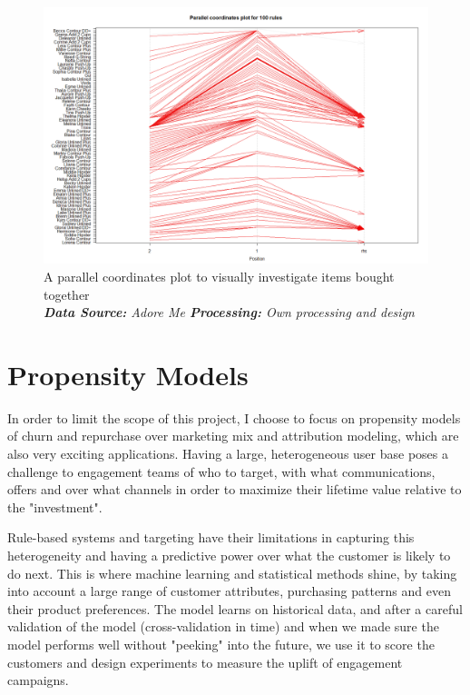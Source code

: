 \documentclass[12pt]{article}
\begin{document}
\begin{figure}[!ht]
	\centering
	\includegraphics[width=1\textwidth]{arules.png}%
	\caption{A parallel coordinates plot to visually investigate items bought together  \\
		\textit{\textbf{Data Source:} Adore Me \textbf{Processing:} Own processing and design}}
\end{figure}


\section{Propensity Models}

In order to limit the scope of this project, I choose to focus on propensity models of churn and repurchase over marketing mix and attribution modeling, which are also very exciting applications. Having a large, heterogeneous user base poses a challenge to engagement teams of who to target, with what communications, offers and over what channels in order to maximize their lifetime value relative to the "investment".

Rule-based systems and targeting have their limitations in capturing this heterogeneity and having a predictive power over what the customer is likely to do next. This is where machine learning and statistical methods shine, by taking into account a large range of customer attributes, purchasing patterns and even their product preferences. The model learns on historical data, and after a careful validation of the model (cross-validation in time) and when we made sure the model performs well without "peeking" into the future, we use it to score the customers and design experiments to measure the uplift of engagement campaigns. 
\end{document}
